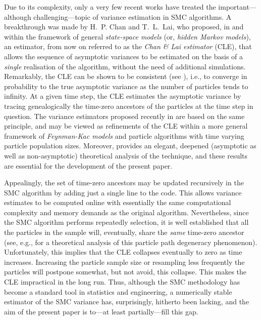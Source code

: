 Due to its complexity, only a very few recent works have treated the important---although challenging---topic of variance estimation in SMC algorithms. A breakthrough was made by H.~P. Chan and T.~L.~Lai, who proposed, in \cite{chan:lai:2013} and within the framework of general \emph{state-space models} (or, \emph{hidden Markov models}), an estimator, from now on referred to as the \emph{Chan \& Lai estimator} (CLE), that allows the sequence of asymptotic variances to be estimated on the basis of a \emph{single} realisation of the algorithm, without the need of additional simulations. Remarkably, the CLE can be shown to be consistent (see \cite[Theorem~2]{chan:lai:2013}), i.e., to converge in probability to the true asymptotic variance as the number of particles tends to infinity. At a given time step, the CLE estimates the asymptotic variance by tracing genealogically the time-zero ancestors of the particles at the time step in question. The variance estimators proposed recently in \cite{lee:whiteley:2016} are based on the same principle, and may be viewed as refinements of the CLE within a more general framework of \emph{Feynman-Kac models} and particle algorithms with time varying particle population sizes. Moreover, \cite{lee:whiteley:2016} provides an elegant, deepened  (asymptotic as well as non-asymptotic) theoretical analysis of the technique, and these results are essential for the development of the present paper. 

Appealingly, the set of time-zero ancestors may be updated recursively in the SMC algorithm by adding  just a single line to the code. This allows variance estimates to be computed online with essentially the same computational complexity and memory demands as the original algorithm. Nevertheless, since the SMC algorithm performs repeatedly selection, it is well established that all the particles in the sample will, eventually, share the \emph{same} time-zero ancestor (see, e.g., \cite{jacob:murray:rubenthaler:2015} for a theoretical analysis of this particle path degeneracy phenomenon). Unfortunately, this implies that the CLE collapses eventually to zero as time increases. Increasing the particle sample size or resampling less frequently the particles will postpone somewhat, but not avoid, this collapse. This makes the CLE impractical in the long run. Thus, although the SMC methodology has become a standard tool in statistics and engineering, a numerically stable estimator of the SMC variance has, surprisingly, hitherto been lacking, and the aim of the present paper is to---at least partially---fill this gap.

